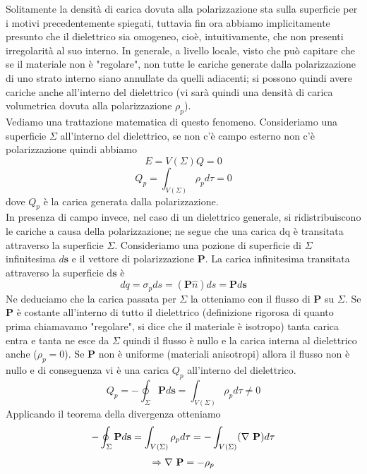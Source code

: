 \documentclass[
10pt, %
a4paper, %
oneside, %
headinclude,footinclude, %
BCOR5mm, %
]{scrartcl}
\begin{document}
Solitamente la densità di carica dovuta alla polarizzazione sta sulla superficie per i motivi precedentemente spiegati, tuttavia fin ora abbiamo implicitamente presunto che il dielettrico sia omogeneo, cioè, intuitivamente, che non presenti irregolarità al suo interno.
In generale, a livello locale, visto che può capitare che se il materiale non è "regolare", non tutte le cariche generate dalla polarizzazione di uno strato interno siano annullate da quelli adiacenti; si possono quindi avere cariche anche all'interno del dielettrico (vi sarà quindi una densità di carica volumetrica dovuta alla polarizzazione \(\rho_p\)).\\
Vediamo una trattazione matematica di questo fenomeno. Consideriamo una superficie $\Sigma$ all'interno del dielettrico, se non c'è campo esterno non c'è polarizzazione quindi abbiamo
\[E = V(\Sigma) Q = 0\]
\[Q_p = \int_{V(\Sigma)}\rho_p d\tau = 0\]
dove \(Q_p\) è la carica generata dalla polarizzazione.\\
In presenza di campo invece, nel caso di un dielettrico generale, si ridistribuiscono le cariche a causa della polarizzazione; ne segue che una carica dq è transitata attraverso la superficie $\Sigma$. Consideriamo una pozione di superficie di \(\Sigma\) infinitesima $d\mathbf{s}$ e il vettore di polarizzazione $\mathbf{P}$. La carica infinitesima transitata attraverso la superficie d$\mathbf{s}$ è
\[dq = \sigma_pds=(\mathbf{P}\hat{n})ds = \mathbf{P}d\mathbf{s}\]
Ne deduciamo che la carica passata per \(\Sigma\) la otteniamo con il flusso di $\mathbf{P}$ su $\Sigma$. Se $\mathbf{P}$ è costante all'interno di tutto il dielettrico (definizione rigorosa di quanto prima chiamavamo "regolare", si dice che il materiale è isotropo) tanta carica entra e tanta ne esce da $\Sigma$ quindi il flusso è nullo e la carica interna al dielettrico anche (\(\rho_p = 0\)). Se $\mathbf{P}$ non è uniforme (materiali anisotropi) allora il flusso non è nullo e di conseguenza vi è una carica $Q_p$ all'interno del dielettrico. 
\[ Q_p = -\oint_{\Sigma} \mathbf{P}d\mathbf{s} = \int_{V(\Sigma)}\rho_p d\tau \neq 0 \]
Applicando il teorema della divergenza otteniamo
\[-\oint_{\Sigma} \mathbf{P}d\mathbf{s} = \int_{V(\Sigma)}\rho_p d\tau = -\int_{V(\Sigma)}(\mathbf{\nabla\ }\mathbf{P})d\tau \]
\begin{align}\label{eq:gradiente_vettore_polarizzazione}
\Rightarrow \mathbf{\nabla\ }\mathbf{P} = -\rho_p
\end{align}
\end{document}

